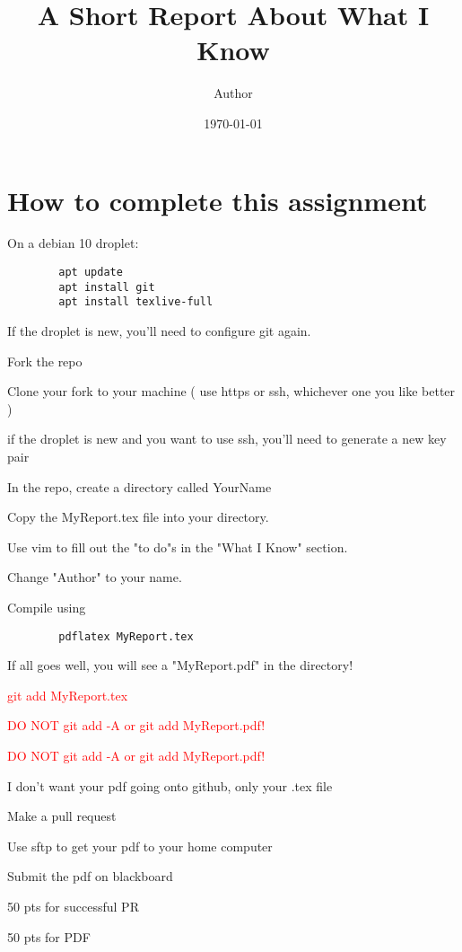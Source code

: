 \documentclass[11pt]{article}
\title{A Short Report About What I Know}
\author{ Author }
\date{\today}
\begin{document}
\maketitle	

\section*{How to complete this assignment}
\begin{todolist}
    \item On a debian 10 droplet:
    \begin{verbatim}
        apt update
        apt install git
        apt install texlive-full
    \end{verbatim}
    \item If the droplet is new, you'll need to configure git again.
    \item Fork the repo
    \item Clone your fork to your machine ( use https or ssh, whichever one you like better )
    \item if the droplet is new and you want to use ssh, you'll need to generate a new key pair
    \item In the repo, create a directory called YourName
    \item Copy the MyReport.tex file into your directory.
    \item Use vim to fill out the "to do"s in the "What I Know" section.
    \item Change "Author" to your name.
    \item Compile using
    \begin{verbatim}
        pdflatex MyReport.tex
    \end{verbatim}
    \item If all goes well, you will see a "MyReport.pdf" in the directory!
    \item \textcolor{red}{ git add MyReport.tex}
    \item {\Large\textcolor{red}{ DO NOT git add -A or git add MyReport.pdf!}}
    \item {\LARGE\textcolor{red}{ DO NOT git add -A or git add MyReport.pdf!}}
    \item I don't want your pdf going onto github, only your .tex  file
    \item Make a pull request
    \item Use sftp to get your pdf to your home computer
    \item Submit the pdf on blackboard
    \item 50 pts for successful PR
    \item 50 pts for PDF
\end{todolist}
\end{document}
